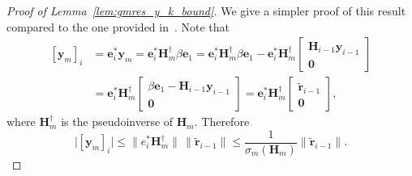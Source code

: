\documentclass[hidelinks,onefignum,onetabnum]{siamart250211}
\begin{document}
\begin{proof}[Proof of Lemma~\ref{lem:gmres_y_k_bound}]
  We give a simpler proof of this result compared to the one provided in~\cite{simoncini2003theory}.
  Note that
  \begin{equation}
      \begin{aligned}
          \left[ \bm y_m \right]_i &= \bm e_i^* \bm y_m = \bm e_i^* \bm H_m^{\dagger} \beta \bm e_1 = \bm e_i^* \bm H_m^{\dagger} \beta \bm e_1 - \bm e_i^* \bm H_m^{\dagger} \begin{bmatrix} \bm H_{i-1} \bm y_{i-1} \\ \bm 0 \end{bmatrix} \\
          & = \bm e_i^* \bm H_m^{\dagger} \begin{bmatrix} \beta \bm e_1 - \bm H_{i-1} \bm y_{i-1} \\ \bm 0 \end{bmatrix} = \bm e_i^* \bm H_m^{\dagger} \begin{bmatrix} \widetilde{\bm r}_{i-1} \\ \bm 0 \end{bmatrix},
      \end{aligned}
  \end{equation}
  where $\bm H_m^{\dagger}$ is the pseudoinverse of $\bm H_m$. Therefore 
  \begin{equation}
      \big| \left[ \bm y_m \right]_i \big|
      \leq \| e_i^* \bm H_m^{\dagger} \| \, \| \widetilde{\bm r}_{i-1} \|
      \leq \dfrac{1}{\sigma_{m}(\bm H_m)} \| \widetilde{\bm r}_{i-1} \|.
  \end{equation}
\end{proof}

%
%
%
%
%
%
%
%
%
%
%
%
%
%
%
%
%
%
%
%
%
%
%
%
\end{document}
